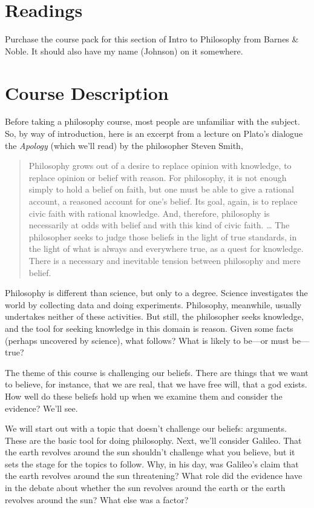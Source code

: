 \documentclass[11pt,oneside]{article}
\begin{document}



\section{Readings}

Purchase the course pack for this section of Intro to Philosophy from Barnes \& Noble. It should also have my name (Johnson) on it somewhere.


\section{Course Description}

Before taking a philosophy course, most people are unfamiliar with the subject. So, by way of introduction, here is an excerpt from a lecture on Plato’s dialogue the \textit{Apology} (which we’ll read) by the philosopher Steven Smith, 
\begin{quote}
Philosophy grows out of a desire to replace opinion with knowledge, to replace opinion or belief with reason. For philosophy, it is not enough simply to hold a belief on faith, but one must be able to give a rational account, a reasoned account for one’s belief. Its goal, again, is to replace civic faith with rational knowledge. And, therefore, philosophy is necessarily at odds with belief and with this kind of civic faith. … The philosopher seeks to judge those beliefs in the light of true standards, in the light of what is always and everywhere true, as a quest for knowledge. There is a necessary and inevitable tension between philosophy and mere belief.
\end{quote}

Philosophy is different than science, but only to a degree. Science investigates the world by collecting data and doing experiments. Philosophy, meanwhile, usually undertakes neither of these activities. But still, the philosopher seeks knowledge, and the tool for seeking knowledge in this domain is reason. Given some facts (perhaps uncovered by science), what follows? What is likely to be---or must be---true? 

The theme of this course is challenging our beliefs. There are things that we want to believe, for instance, that we are real, that we have free will, that a god exists. How well do these beliefs hold up when we examine them and consider the evidence? We’ll see.

We will start out with a topic that doesn’t challenge our beliefs: arguments. These are the basic tool for doing philosophy. Next, we’ll consider Galileo. That the earth revolves around the sun shouldn’t challenge what you believe, but it sets the stage for the topics to follow. Why, in his day, was Galileo’s claim that the earth revolves around the sun threatening? What role did the evidence have in the debate about whether the sun revolves around the earth or the earth revolves around the sun? What else was a factor? 
\end{document}
